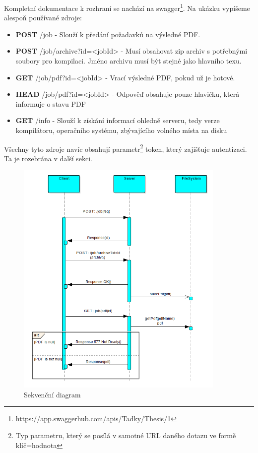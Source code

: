 Kompletní dokumentace k rozhraní se nachází na swagger\footnote{https://app.swaggerhub.com/apis/Tadky/Thesis/1}. Na ukázku vypíšeme alespoň používané zdroje:
\begin{itemize}
	\item \textbf{POST} {\ttfamily /job} - Slouží k předání požadavků na výsledné PDF.
	\item \textbf{POST} {\ttfamily /job/archive?id=<jobId>} - Musí obsahovat zip archiv s potřebnými soubory pro kompilaci. Jméno archivu musí být stejné jako hlavního texu.
	\item \textbf{GET} {\ttfamily /job/pdf?id=<jobId>} - Vrací výsledné PDF, pokud už je hotové.
	\item \textbf{HEAD} {\ttfamily /job/pdf?id=<jobId>} - Odpověď obsahuje pouze hlavičku, která informuje o stavu PDF
	\item \textbf{GET} {\ttfamily /info} - Slouží k získání informací ohledně serveru, tedy verze kompilátoru, operačního systému, zbývajícího volného místa na disku
\end{itemize}
Všechny tyto zdroje navíc obsahují parametr\footnote{Typ parametru, který se posílá v samotné URL daného dotazu ve formě klíč=hodnota} token, který zajišťuje autentizaci. Ta je rozebrána v další sekci.

\begin{figure}[H]
	\includegraphics[width=0.9\textwidth]{diagram}
	\centering
	\caption{Sekvenční diagram}
	\label{fig:seq}
\end{figure}

